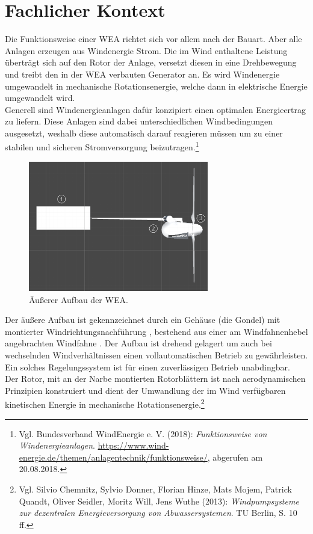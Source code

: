 \section{Fachlicher Kontext}
\label{sec:FachlicherKontext}
Die Funktionsweise einer WEA richtet sich vor allem nach der Bauart. Aber alle Anlagen erzeugen aus Windenergie Strom. Die im Wind enthaltene Leistung überträgt sich auf den Rotor der Anlage, versetzt diesen in eine Drehbewegung und treibt den in der WEA verbauten Generator an. Es wird Windenergie umgewandelt in mechanische Rotationsenergie, welche dann in elektrische Energie umgewandelt wird. \\
Generell sind Windenergieanlagen dafür konzipiert einen optimalen Energieertrag zu liefern. Diese Anlagen sind dabei unterschiedlichen Windbedingungen ausgesetzt, weshalb diese   automatisch darauf reagieren müssen um zu einer stabilen und sicheren Stromversorgung beizutragen.\footnote{Vgl. Bundesverband WindEnergie e. V.  (2018): \textit{Funktionsweise von Windenergieanlagen}.\newline
\url{https://www.wind-energie.de/themen/anlagentechnik/funktionsweise/},\newline 
abgerufen am 20.08.2018.}  





\begin{figure}[H]
	\centering
	\captionsetup{width=0.7\textwidth}
	\includegraphics[keepaspectratio, width=0.7\textwidth]{bildquellen/WEA1_1}
	\caption{Äußerer Aufbau der WEA.}
	\label{fig:1}
\end{figure}

Der äußere Aufbau ist gekennzeichnet durch ein Gehäuse (die Gondel) mit montierter Windrichtungsnachführung , bestehend aus einer am Windfahnenhebel angebrachten Windfahne . Der Aufbau ist drehend gelagert um auch bei wechselnden Windverhältnissen einen vollautomatischen Betrieb zu gewährleisten. Ein solches Regelungssystem ist für einen zuverlässigen Betrieb unabdingbar. \\
Der Rotor, mit an der Narbe montierten Rotorblättern  ist nach aerodynamischen Prinzipien konstruiert und dient der Umwandlung der im Wind verfügbaren kinetischen Energie in mechanische Rotationsenergie.\footnote{Vgl. Silvio Chemnitz, Sylvio Donner, Florian Hinze, Mats Mojem, Patrick Quandt, Oliver Seidler, Moritz Will, Jens Wuthe (2013): \textit{Windpumpsysteme zur dezentralen Energieversorgung von Abwassersystemen}. TU Berlin, S. 10 ff.}

